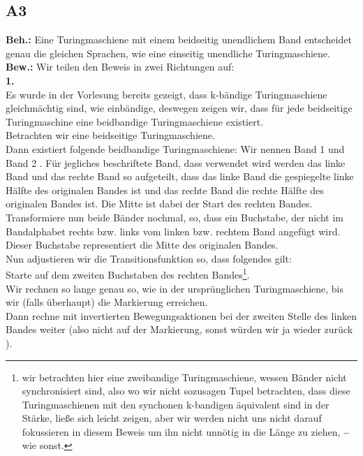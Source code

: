 \documentclass[12pt, a4paper]{article}
\newcommand*{\gedanke}{\textbf{-- }}
\newcommand*{\gap}{\text{ }}
\newcommand*{\beh}{\textbf{Beh.:} \gap}
\newcommand*{\bew}{\textbf{Bew.:} \gap}
\begin{document}
\subsection*{A3}
\beh Eine Turingmaschiene mit einem beidseitig unendlichem Band entscheidet genau die gleichen Sprachen, wie eine einseitig unendliche Turingmaschiene. \\
\bew Wir teilen den Beweis in zwei Richtungen auf: \\
\textbf{1. } \textquote{\(\Rightarrow\)} \\
Es wurde in der Vorlesung bereits gezeigt, dass k-bändige Turingmaschiene gleichmächtig sind, wie einbändige, deswegen zeigen wir, dass für jede beidseitige Turingmaschine eine beidbandige Turingmaschiene existiert. \\
Betrachten wir eine beidseitige Turingmaschiene. \\
Dann existiert folgende beidbandige Turingmaschiene: Wir nennen Band 1  und Band 2 . Für jegliches beschriftete Band, dass verwendet wird werden das linke Band und das rechte Band so aufgeteilt, dass das linke Band die gespiegelte linke Hälfte des originalen Bandes ist und das rechte Band die rechte Hälfte des originalen Bandes ist. Die Mitte ist dabei der Start des rechten Bandes.\\
Transformiere nun beide Bänder nochmal, so, dass ein Buchstabe, der nicht im Bandalphabet rechts bzw. links vom linken bzw. rechtem Band angefügt wird. Dieser Buchstabe representiert die Mitte des originalen Bandes. \\
Nun adjustieren wir die Transitionsfunktion so, dass folgendes gilt:\\
Starte auf dem zweiten Buchstaben des rechten Bandes\footnote[1]{wir betrachten hier eine zweibandige Turingmaschiene, wessen Bänder nicht synchronisiert sind, also wo wir nicht sozusagen Tupel betrachten, dass diese Turingmaschienen mit den synchonen k-bandigen äquivalent sind in der Stärke, ließe sich leicht zeigen, aber wir werden nicht uns nicht darauf fokussieren in diesem Beweis um ihn nicht unnötig in die Länge zu ziehen, \gedanke wie sonst.}.\\
Wir rechnen so lange genau so, wie in der ursprünglichen Turingmaschiene, bis wir (falls überhaupt) die Markierung erreichen. \\
Dann rechne mit invertierten Bewegungsaktionen bei der zweiten Stelle des linken Bandes weiter (also nicht auf der Markierung, sonst würden wir ja wieder zurück ).\\
\end{document}
